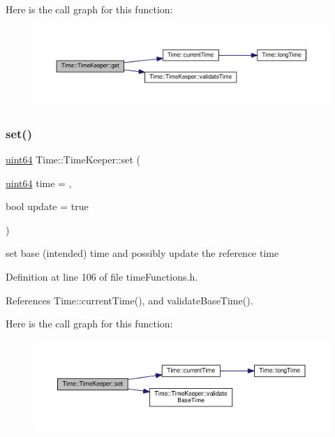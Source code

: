 Here is the call graph for this function\+:\nopagebreak
\begin{figure}[H]
\begin{center}
\leavevmode
\includegraphics[width=350pt]{classTime_1_1TimeKeeper_a1cb3ff75c82149d1d8fc19bd91d0dec7_cgraph}
\end{center}
\end{figure}
\mbox{\label{classTime_1_1TimeKeeper_a3495ee4c92a5c4540a6a223c0cc6eeed}} 
\subsubsection{\texorpdfstring{set()}{set()}}
{\footnotesize\ttfamily \hyperlink{systemDefines_8h_abc0f5bc07737e498f287334775dff2b6}{uint64} Time\+::\+Time\+Keeper\+::set (\begin{DoxyParamCaption}\item[{\hyperlink{systemDefines_8h_abc0f5bc07737e498f287334775dff2b6}{uint64}}]{time = {},  }\item[{bool}]{update = {\ttfamily true} }\end{DoxyParamCaption})\hspace{0.3cm}{\ttfamily [inline]}}

set base (intended) time and possibly update the reference time 

Definition at line 106 of file time\+Functions.\+h.



References Time\+::current\+Time(), and validate\+Base\+Time().

Here is the call graph for this function\+:\nopagebreak
\begin{figure}[H]
\begin{center}
\leavevmode
\includegraphics[width=350pt]{classTime_1_1TimeKeeper_a3495ee4c92a5c4540a6a223c0cc6eeed_cgraph}
\end{center}
\end{figure}
\mbox{\label{classTime_1_1TimeKeeper_a033210ff55b364ea2cb409506b988bc2}} 
